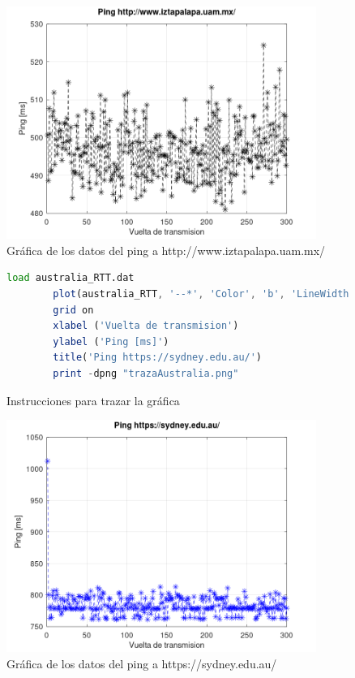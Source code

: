 \begin{figure}[H]
	\centering
	\includegraphics[width=0.90\textwidth]{img/trazaUam.png}
	\caption{Gr\'afica de los datos del ping a http://www.iztapalapa.uam.mx/}
	\label{fig:uamGraph}
\end{figure}

\newpage

\begin{figure}[H] 
    \centering 
    \begin{lstlisting}[frame=single, breaklines=true, basicstyle=\footnotesize\ttfamily, breakatwhitespace=false, columns=flexible, tabsize=2, showstringspaces=false, language=Octave] 
        load australia_RTT.dat 
        plot(australia_RTT, '--*', 'Color', 'b', 'LineWidth', 0.5, 'MarkerSize', 8) 
        grid on 
        xlabel ('Vuelta de transmision') 
        ylabel ('Ping [ms]') 
        title('Ping https://sydney.edu.au/') 
        print -dpng "trazaAustralia.png" 
    \end{lstlisting} 
    \caption{Instrucciones para trazar la gr\'afica} 
    \label{fig:australiaOctave} 
\end{figure}

\begin{figure}[H]
	\centering
	\includegraphics[width=0.90\textwidth]{img/trazaAustralia.png}
	\caption{Gr\'afica de los datos del ping a https://sydney.edu.au/}
	\label{fig:australiaGraph}
\end{figure}

